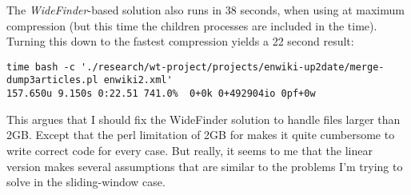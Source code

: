 The \textit{WideFinder}-based solution also runs in 38 seconds,
when using  at maximum compression (but this time
the children processes are included in the time).
Turning this down to the fastest compression yields a 22 second result:
\begin{verbatim}
time bash -c './research/wt-project/projects/enwiki-up2date/merge-dump3articles.pl enwiki2.xml'
157.650u 9.150s 0:22.51 741.0%  0+0k 0+492904io 0pf+0w
\end{verbatim}

This argues that I should fix the WideFinder solution to handle files larger than 2GB.
Except that the perl limitation of 2GB for  makes it
quite cumbersome to write correct code for every case.
But really, it seems to me that the linear version makes several assumptions
that are similar to the problems I'm trying to solve in the sliding-window case.

